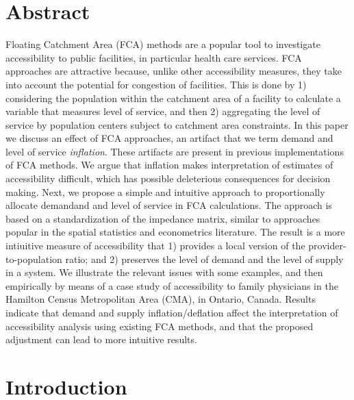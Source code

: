\documentclass[10pt,letterpaper]{article}
\begin{document}
\section*{Abstract}
Floating Catchment Area (FCA) methods are a popular tool to investigate
accessibility to public facilities, in particular health care services.
FCA approaches are attractive because, unlike other accessibility
measures, they take into account the potential for congestion of
facilities. This is done by 1) considering the population within the
catchment area of a facility to calculate a variable that measures level
of service, and then 2) aggregating the level of service by population
centers subject to catchment area constraints. In this paper we discuss
an effect of FCA approaches, an artifact that we term demand and level
of service \emph{inflation}. These artifacts are present in previous
implementations of FCA methods. We argue that inflation makes
interpretation of estimates of accessibility difficult, which has
possible deleterious consequences for decision making. Next, we propose
a simple and intuitive approach to proportionally allocate demandand and
level of service in FCA calculations. The approach is based on a
standardization of the impedance matrix, similar to approaches popular
in the spatial statistics and econometrics literature. The result is a
more intiuitive measure of accessibility that 1) provides a local
version of the provider-to-population ratio; and 2) preserves the level
of demand and the level of supply in a system. We illustrate the
relevant issues with some examples, and then empirically by means of a
case study of accessibility to family physicians in the Hamilton Census
Metropolitan Area (CMA), in Ontario, Canada. Results indicate that
demand and supply inflation/deflation affect the interpretation of
accessibility analysis using existing FCA methods, and that the proposed
adjustment can lead to more intuitive results.


\linenumbers

\section{Introduction}\label{introduction}
\end{document}
